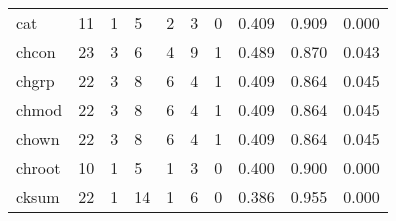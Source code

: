 \begin{longtable}{lp{2.0cm}p{2.0cm}p{2.0cm}p{2.0cm}p{2.0cm}p{2.0cm}p{2.0cm}p{2.0cm}p{2.0cm}}
cat       &                     11 &                                             1 &                                            5 &                                           2 &                                            3 &                                          0 &                                0.409 &                                  0.909 &                                0.000 \\
chcon     &                     23 &                                             3 &                                            6 &                                           4 &                                            9 &                                          1 &                                0.489 &                                  0.870 &                                0.043 \\
chgrp     &                     22 &                                             3 &                                            8 &                                           6 &                                            4 &                                          1 &                                0.409 &                                  0.864 &                                0.045 \\
chmod     &                     22 &                                             3 &                                            8 &                                           6 &                                            4 &                                          1 &                                0.409 &                                  0.864 &                                0.045 \\
chown     &                     22 &                                             3 &                                            8 &                                           6 &                                            4 &                                          1 &                                0.409 &                                  0.864 &                                0.045 \\
chroot    &                     10 &                                             1 &                                            5 &                                           1 &                                            3 &                                          0 &                                0.400 &                                  0.900 &                                0.000 \\
cksum     &                     22 &                                             1 &                                           14 &                                           1 &                                            6 &                                          0 &                                0.386 &                                  0.955 &                                0.000 \\

\end{longtable}
